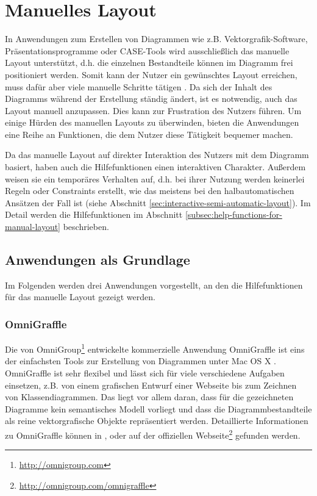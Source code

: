 \section{Manuelles Layout}
\label{sec:manual-layout}

In Anwendungen zum Erstellen von Diagrammen wie z.B. Vektorgrafik-Software, Präsentationsprogramme oder CASE-Tools wird ausschließlich das manuelle Layout unterstützt, d.h. die einzelnen Bestandteile können im Diagramm frei positioniert werden. Somit kann der Nutzer ein gewünschtes Layout erreichen, muss dafür aber viele manuelle Schritte tätigen \cite{Eichelberger05Aesthetics}. Da sich der Inhalt des Diagramms während der Erstellung ständig ändert, ist es notwendig, auch das Layout manuell anzupassen. Dies kann zur Frustration des Nutzers führen. Um einige Hürden des manuellen Layouts zu überwinden, bieten die Anwendungen eine Reihe an Funktionen, die dem Nutzer diese Tätigkeit bequemer machen.

Da das manuelle Layout auf direkter Interaktion des Nutzers mit dem Diagramm basiert, haben auch die Hilfefunktionen einen interaktiven Charakter. Außerdem weisen sie ein temporäres Verhalten auf, d.h. bei ihrer Nutzung werden keinerlei Regeln oder Constraints erstellt, wie das meistens bei den halbautomatischen Ansätzen der Fall ist (siehe Abschnitt \ref{sec:interactive-semi-automatic-layout}). Im Detail werden die Hilfefunktionen im Abschnitt \ref{subsec:help-functions-for-manual-layout} beschrieben.

\subsection{Anwendungen als Grundlage}
\label{subsec:applications-for-manual-layout}

Im Folgenden werden drei Anwendungen vorgestellt, an den die Hilfefunktionen für das manuelle Layout gezeigt werden.

\subsubsection{OmniGraffle}
\label{subsubsec:omnigraffle}

Die von OmniGroup\footnote{\url{http://omnigroup.com}} entwickelte kommerzielle Anwendung OmniGraffle ist eins der einfachsten Tools zur Erstellung von Diagrammen unter Mac OS X \cite{Olsen10OmniGraffle}. OmniGraffle ist sehr flexibel und lässt sich für viele verschiedene Aufgaben einsetzen, z.B. von einem grafischen Entwurf einer Webseite bis zum Zeichnen von Klassendiagrammen. Das liegt vor allem daran, dass für die gezeichneten Diagramme kein semantisches Modell vorliegt und dass die Diagrammbestandteile als reine vektorgrafische Objekte repräsentiert werden. Detaillierte Informationen zu OmniGraffle können in \cite{08OmniGraffle}, \cite{Olsen10OmniGraffle} oder auf der offiziellen Webseite\footnote{\url{http://omnigroup.com/omnigraffle}} gefunden werden.

